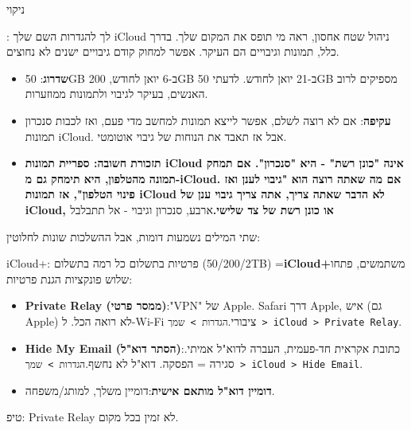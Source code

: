 
ניקוי

: לך להגדרות השם שלך iCloud ניהול שטח אחסון, ראה מי תופס את המקום שלך. בדרך כלל, תמונות וגיבויים הם העיקר. אפשר למחוק קודם גיבויים ישנים לא נחוצים.

\begin{itemize}
  \item \textbf{שדרוג}: 50GB ב-6 יואן לחודש, 200GB ב-21 יואן לחודש. לדעתי 50GB מספיקים לרוב האנשים, בעיקר לגיבוי ולתמונות ממוזערות.
  \item \textbf{עקיפה}: אם לא רוצה לשלם, אפשר לייצא תמונות למחשב מדי פעם, ואז לכבות סנכרון תמונות iCloud. אבל אז תאבד את הנוחות של גיבוי אוטומטי.
  \item \textbf{תזכורת חשובה: ספריית תמונות iCloud אינה "כונן רשת" - היא "סנכרון". אם תמחק תמונה מהטלפון, היא תימחק גם מ-iCloud. אם מה שאתה רוצה הוא "גיבוי לענן ואז פינוי הטלפון", אז תמונות iCloud לא הדבר שאתה צריך, אתה צריך גיבוי ענן של iCloud, או כונן רשת של צד שלישי.}ארבע, סנכרון וגיבוי - אל תתבלבל
\end{itemize}

שתי המילים נשמעות דומות, אבל ההשלכות שונות לחלוטין:

\begin{tcbinfo}{iCloud+: פרטיות בתשלום}
כל רמה בתשלום (50/200/2TB) =\textbf{iCloud+}משתמשים, פתחו שלוש פונקציות הגנת פרטיות:

\begin{itemize}
  \item \textbf{Private Relay (ממסר פרטי)}:"VPN" של Apple. Safari דרך Apple, איש (גם Apple) לא רואה הכל. ל-Wi-Fi ציבורי.\texttt{הגדרות > שמך > iCloud > Private Relay}.
  \item \textbf{Hide My Email (הסתר דוא"ל)}:כתובת אקראית חד-פעמית, העברה לדוא"ל אמיתי. סגירה = הפסקה. דוא"ל לא נחשף.\texttt{הגדרות > שמך > iCloud > Hide Email}.
  \item \textbf{דומיין דוא"ל מותאם אישית}:דומיין משלך, למותג/משפחה.
\end{itemize}

טיפ: Private Relay לא זמין בכל מקום.

\end{tcbinfo}

